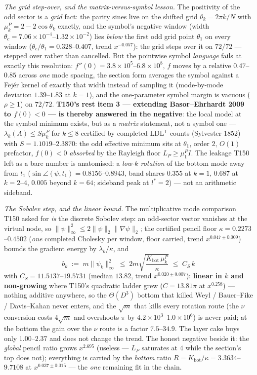 \documentclass[11pt,a4paper]{article}
\begin{document}
\emph{The grid step-over, and the matrix-versus-symbol lesson.} The positivity of the odd
sector is a \emph{grid} fact: the parity sines live on the shifted grid $\theta_k=2\pi k/N$
with $\mu^P_k=2-2\cos\theta_k$ exactly, and the symbol's negative window (width
$\theta_c=7.06\times10^{-4}$--$1.32\times10^{-2}$) lies \emph{below} the first odd grid point
$\theta_1$ on every window ($\theta_c/\theta_1=0.328$--$0.407$, trend $x^{-0.057}$): the
grid steps over it on $72/72$ --- stepped over rather than cancelled. But the pointwise
symbol \emph{language} fails at exactly this resolution: $f''(0)=3.8\times10^{5}$--$6.8\times
10^{8}$, $f$ moves by a relative $0.47$--$0.85$ across \emph{one} mode spacing, the section
form averages the symbol against a Fej\'er kernel of exactly that width instead of sampling
it (mode-by-mode deviation $1.39$--$1.83$ at $k=1$), and the one-parameter symbol margin is
vacuous ($\rho\ge1$) on $72/72$. \textbf{T150's rest item 3 --- extending Basor--Ehrhardt
2009 to $f(0)<0$ --- is thereby answered in the negative}: the local model at the symbol
minimum exists, but as a \emph{matrix} statement, not a symbol one ---
$\lambda_k(A)\le S\mu^P_k$ for $k\le8$ certified by completed LDL$^{\mathsf T}$ counts
(Sylvester 1852) with $S=1.1019$--$2.3870$: the odd effective minimum sits at $\theta_1$,
order $2$, $O(1)$ prefactor, $f(0)<0$ \emph{absorbed} by the Rayleigh floor
$L_P\ge\mu^P_1I$. The leakage T150 left as a bare number is anatomised: a \emph{low-$k$
rotation} of the bottom mode away from $t_1$ ($\sin\angle(\psi,t_1)=0.8156$--$0.8943$,
band shares $0.355$ at $k=1$, $0.687$ at $k=2$--$4$, $0.005$ beyond $k=64$; sideband peak at
$l^\ast=2$) --- not an arithmetic sideband.

\emph{The Sobolev step, and the linear bound.} The multiplicative mode comparison T150 asked
for \emph{is} the discrete Sobolev step: an odd-sector vector vanishes at the virtual node,
so $\|\psi\|_\infty^2\le2\|\psi\|_2\|\nabla\psi\|_2$; the certified pencil floor
$\kappa=0.2273$--$0.4502$ (\emph{one} completed Cholesky per window, floor carried, trend
$x^{0.047\pm0.009}$) bounds the gradient energy by $\lambda_k/\kappa$, and
\[
b_k\;:=\;m\|\psi_k\|_\infty^2\;\le\;2m\sqrt{\frac{K_{\mathrm{bot}}\,\mu^P_k}{\kappa}}
\;\le\;C_S\,k
\]
with $C_S=11.5137$--$19.5731$ (median $13.82$, trend $x^{0.020\pm0.007}$):
\textbf{linear in $k$ and non-growing} where T150's quadratic ladder grew ($C=13.81\pi$ at
$x^{0.258}$) --- nothing additive anywhere, so the $\Theta(D^3)$ bottom that killed Weyl /
Bauer--Fike / Davis--Kahan never enters, and the $\sqrt m$ that kills every rotation route
(the $\nu$ conversion costs $4\sqrt m$ and overshoots $\pi$ by $4.2\times10^{3}$--$1.0\times
10^{6}$) is never paid; at the bottom the gain over the $\nu$ route is a factor
$7.5$--$34.9$. The layer cake buys only $1.00$--$2.37$ and does not change the trend. The
honest negative beside it: the \emph{global} pencil ratio grows $x^{2.695}$ (useless ---
$L_P$ saturates at $4$ while the section's top does not); everything is carried by the
\emph{bottom} ratio $R=K_{\mathrm{bot}}/\kappa=3.3634$--$9.7108$ at $x^{0.037\pm0.015}$ ---
the \emph{one} remaining fit in the chain.
\end{document}
